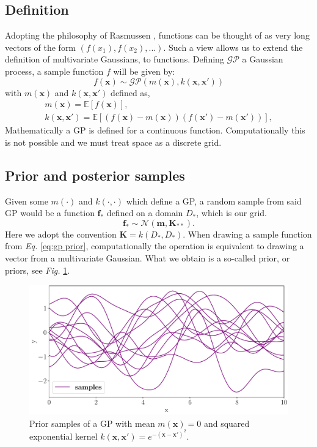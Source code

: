 \subsection{Definition}
Adopting the philosophy of Rasmussen \cite{rasmussen}, functions can be thought of as very long vectors of the form $\left(f(x_1), f(x_2), ...\right)$. Such a view allows us to extend the definition of multivariate Gaussians, to functions. Defining $\mathcal{GP}$ a Gaussian process, a sample function $f$ will be given by:
\begin{equation}
    f(\bm{x}) \sim \mathcal{GP}\left(m(\bm{x}), k(\bm{x}, \bm{x'})\right)
\end{equation}
with $m(\bm{x})$ and $k(\bm{x}, \bm{x'})$ defined as,
\begin{gather}
    m(\bm{x})=\mathbb{E}[f(\bm{x})],\\
    k(\bm{x}, \bm{x'})=\mathbb{E}[(f(\bm{x})-m(\bm{x}))(f(\bm{x}')-m(\bm{x}'))],
\end{gather}
 Mathematically a GP is defined for a continuous function. Computationally this is not possible and we must treat space as a discrete grid. 

\subsection{Prior and posterior samples}
Given some $m(\cdot)$ and $k(\cdot,\cdot)$ which define a GP, a random sample from said GP would be a function $\bm{f}_*$ defined on a domain $D_*$, which is our grid.
\begin{equation}
    \bm{f}_* \sim \mathcal{N}(\bm{m}, \bm{K}_{**}).
    \label{eq:gp prior}
\end{equation}
Here we adopt the convention $\bm{K} = k(D_*,D_*)$. When drawing a sample function from \textit{Eq. }\eqref{eq:gp prior}, computationally the operation is equivalent to drawing a vector from a multivariate Gaussian. What we obtain is a so-called prior, or priors, see \textit{Fig. }\ref{fig:priors}.
\begin{figure}[h]
    \centering
    \includegraphics[width=\textwidth]{images/1_priors.pdf}
    \caption{Prior samples of a GP with mean $m(\bm{x})=0$ and squared exponential kernel $k(\bm{x},\bm{x'})=e^{-(\bm{x}-\bm{x'})^2}$.}
    \label{fig:priors}
\end{figure}

